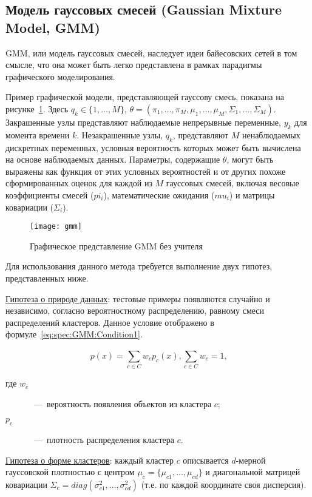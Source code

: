 \subsection{Модель гауссовых смесей (Gaussian Mixture Model, GMM)}
GMM, или модель гауссовых смесей, наследует идеи байесовских сетей в том смысле, что она может быть легко представлена в рамках парадигмы графического моделирования.

Пример графической модели, представляющей гауссову смесь, показана на рисунке~\ref{fig:spec:GmmRepresentation}. Здесь $q_k\in \{1,\dots,M\}$, $\theta = (\pi_1,\dots,\pi_M,\mu_1,\dots,\mu_M,\Sigma_1,\dots,\Sigma_M)$. Закрашенные узлы представляют наблюдаемые непрерывные переменные, $y_k$ для момента времени $k$. Незакрашенные узлы, $q_k$, представляют $M$ ненаблюдаемых дискретных переменных, условная вероятность которых может быть вычислена на основе наблюдаемых данных. Параметры, содержащие $\theta$, могут быть выражены как функция от этих условных вероятностей и от других похоже сформированных оценок для каждой из $M$ гауссовых смесей, включая весовые коэффициенты смесей ($pi_i$), математические ожидания ($mu_i$) и матрицы ковариации ($\Sigma_i$).

\begin{figure}[h]
\texttt{[image: gmm]}
\caption{Графическое представление GMM без учителя}
\label{fig:spec:GmmRepresentation}
\end{figure}

Для использования данного метода требуется выполнение двух гипотез, представленных ниже.

\uline{Гипотеза о природе данных}: тестовые примеры появляются случайно и независимо, согласно вероятностному распределению, равному смеси распределений кластеров. Данное условие отображено в формуле~\eqref{eq:spec:GMM:Condition1}.

\begin{equation} \label{eq:spec:GMM:Condition1}
p(x) = \sum_{c\in C}^{} w_c p_c(x), \sum_{c\in C}^{} w_c = 1\text{,}
\end{equation}
\begin{description}
	\item[где $w_c$]~---~вероятность появления объектов из кластера $c$;
	\item[$p_c$]~---~плотность распределения кластера $c$.
\end{description}

\uline{Гипотеза о форме кластеров}: каждый кластер $c$ описывается $d$-мерной гауссовской плотностью с центром $\mu_c = \{\mu_{c1},\dots,\mu_{cd}\}$ и диагональной матрицей ковариации $\Sigma_c = diag(\sigma^2_{c1},\dots,\sigma^2_{cd})$ (т.е. по каждой координате своя дисперсия).

